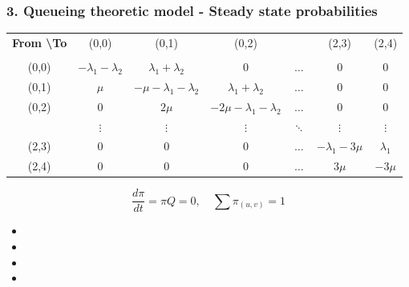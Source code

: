 \begin{frame}
    \frametitle{3. Queueing theoretic model - Steady state probabilities}
    \centering
    
    \tiny
    \renewcommand{\arraystretch}{1.5}
    \begin{tabular}{c|c|c|c|c|c|c|}
        \multicolumn{1}{c}{\textbf{From \textbackslash To}}
        & \multicolumn{1}{c}{(0,0)} & 
        \multicolumn{1}{c}{(0,1)} & \multicolumn{1}{c}{(0,2)} & 
        \multicolumn{1}{c}{} & \multicolumn{1}{c}{(2,3)} &
        \multicolumn{1}{c}{(2,4)} \\

        \multicolumn{1}{c}{} & \multicolumn{1}{c}{} & \multicolumn{1}{c}{} &
        \multicolumn{1}{c}{} & \multicolumn{1}{c}{} & \multicolumn{1}{c}{} & 
        \multicolumn{1}{c}{} \\

        \cline{2-7}
        (0,0) & \(-\lambda_1 - \lambda_2\) & \(\lambda_1 + \lambda_2\) & 0 & \(\dots\) & 0 & 0 \\
        \cline{2-7}
        (0,1) & \(\mu\) & \(-\mu - \lambda_1 - \lambda_2\) & \(\lambda_1 + \lambda_2\) & \(\dots\) & 0 & 0 \\
        \cline{2-7}
        (0,2) & 0 & \(2\mu\) & \(-2\mu - \lambda_1 - \lambda_2\) & \(\dots\) & 0 & 0 \\
        \cline{2-7}
        & \(\vdots\) & \(\vdots\) & \(\vdots\) & \(\ddots\) & \(\vdots\) & \(\vdots\) \\
        \cline{2-7}
        (2,3) & 0 & 0 & 0 & \(\dots\) & \(-\lambda_1 - 3\mu\) & \(\lambda_1\) \\
        \cline{2-7}
        (2,4) & 0 & 0 & 0 & \(\dots\) & \(3\mu\) & \(-3\mu\) \\
        \cline{2-7}
    \end{tabular}

    \normalsize

    \begin{equation*}
        \frac{d \pi}{dt} = \pi Q = 0,
        \quad \sum \pi_{(u,v)} = 1
    \end{equation*}

    \vspace{0.5cm}

    \begin{multicols}{2}
        \begin{itemize}
            \centering
            \item \color{teal}{Numerical integration}
            \item \color{teal}{Linear algebraic method}
            \columnbreak
            \item \color{teal}{Least squares method}
            \item \color{purple}{Closed-form approach}
        \end{itemize}    
    \end{multicols}

\end{frame}


